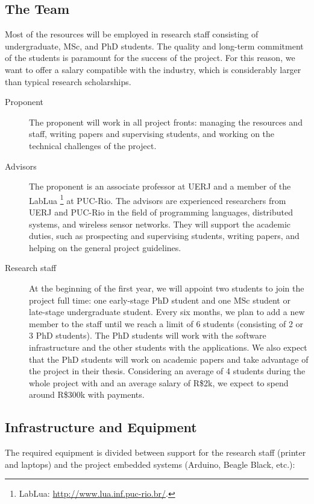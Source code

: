 \documentclass[12pt,english]{amsart}
\begin{document}
\subsection{The Team}

Most of the resources will be employed in research staff consisting
of undergraduate, MSc, and PhD students.
%
The quality and long-term commitment of the students is paramount for the
success of the project.
%
For this reason, we want to offer a salary compatible with the industry, which
is considerably larger than typical research scholarships.

\begin{description}
\item[Proponent]
The proponent will work in all project fronts: managing the resources and
staff, writing papers and supervising students, and working on the technical
challenges of the project.
\item[Advisors]
The proponent is an associate professor at UERJ and a member of the LabLua%
\footnote{LabLua: \url{http://www.lua.inf.puc-rio.br/}.}
at PUC-Rio.
The advisors are experienced researchers from UERJ and PUC-Rio in the field of
programming languages, distributed systems, and wireless sensor networks.
They will support the academic duties, such as prospecting and supervising
students, writing papers, and helping on the general project guidelines.
\item[Research staff]
At the beginning of the first year, we will appoint two students to join the
project full time:
    one early-stage PhD student
and
    one MSc student or late-stage undergraduate student.
Every six months, we plan to add a new member to the staff until we reach a
limit of 6 students (consisting of 2 or 3 PhD students).
The PhD students will work with the software infrastructure and the other
students with the applications.
We also expect that the PhD students will work on academic papers and
take advantage of the project in their thesis.
Considering an average of 4 students during the whole project with and an
average salary of R\$2k, we expect to spend around R\$300k with payments.
\end{description}

\subsection{Infrastructure and Equipment}

The required equipment is divided between support for the research staff (printer and
laptops) and the project embedded systems (Arduino, Beagle Black, etc.):
\newline
\end{document}
